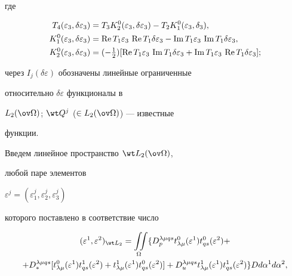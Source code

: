 где 


\begin{align} 


T_4(\varepsilon_3,\delta\varepsilon_3)&= 


T_3 K^0_2(\varepsilon_3,\delta\varepsilon_3)- 


T_2K^0_1(\varepsilon_3,\delta_3),\notag \\ 


K^0_1(\varepsilon_3,\delta\varepsilon_3)&= 


\re T_1\varepsilon_3\,\re T_1\delta\varepsilon_3- 


\im T_1\varepsilon_3\,\im T_1\delta\varepsilon_3, \\ 


K^0_2(\varepsilon_3,\delta\varepsilon_3)&= 


(-\tfrac{1}{2})[\re T_1\varepsilon_3\,\im T_1\delta\varepsilon_3+ 


\im T_1\varepsilon_3\,\re T_1\delta\varepsilon_3];\notag 


\end{align} 


через $I_j(\delta\varepsilon)$ обозначены линейные ограниченные 


относительно $\delta\varepsilon$ функционалы в 


$L_2(\ov\Omega)$; $\wt Q^j$ ($\in L_2(\ov\Omega)$) --- известные 


функции. 





Введем линейное пространство $\wt L_2(\ov\Omega)$, 


любой паре элементов 


$\varepsilon^j=(\varepsilon^j_1,\varepsilon^j_2,\varepsilon^j_3)$ 


которого поставлено в соответствие число 


\begin{multline} 


(\varepsilon^1,\varepsilon^2)_{\wt L_2}=\intO 


\{D^{\lambda\mu qs}_p t^0_{\lambda\mu}(\varepsilon^1) 


t^0_{qs}(\varepsilon^2)+ \\ 


%


+ D^{\lambda\mu qs}_*[t^0_{\lambda\mu}(\varepsilon^1) 


t^1_{qs}(\varepsilon^2)+t^1_{\lambda\mu}(\varepsilon^1) 


t^0_{qs}(\varepsilon^2)]+D^{\lambda\mu qs}_u 


t^1_{\lambda\mu}(\varepsilon^1)t^1_{qs}(\varepsilon^2)\} 


D d\alpha^1d\alpha^2, 


\end{multline} 


